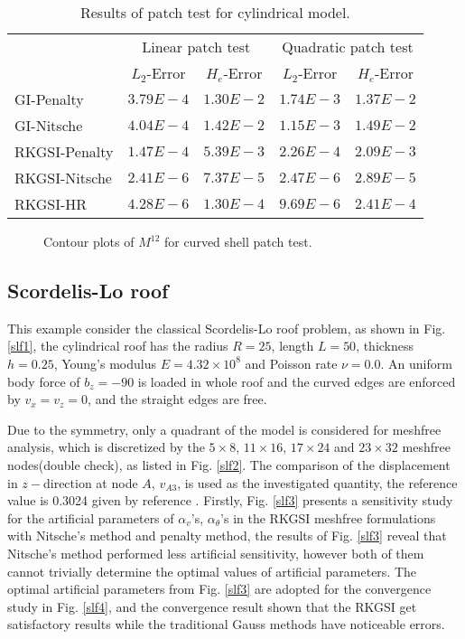 \begin{table}[!ht]
\centering
\caption{Results of patch test for cylindrical model.}\label{ptt2}
\begin{tabular}{lcccc}
\toprule
 & \multicolumn{2}{c}{Linear patch test} & \multicolumn{2}{c}{Quadratic patch test} \\ \cline{2-5}
 & $L_2$-Error & $H_e$-Error & $L_2$-Error & $H_e$-Error \\
    \midrule
    GI-Penalty & $3.79E-4$ & $1.30E-2$ & $1.74E-3$ & $1.37E-2$ \\
    GI-Nitsche & $4.04E-4$ & $1.42E-2$ & $1.15E-3$ & $1.49E-2$ \\
    RKGSI-Penalty & $1.47E-4$ & $5.39E-3$ & $2.26E-4$ & $2.09E-3$ \\
    RKGSI-Nitsche & $2.41E-6$ & $7.37E-5$ & $2.47E-6$ & $2.89E-5$ \\
    RKGSI-HR & $4.28E-6$ & $1.30E-4$ & $9.69E-6$ & $2.41E-4$ \\
    \bottomrule
\end{tabular}
\end{table}

\begin{figure}[!ht]
\centering
\caption{Contour plots of $M^{12}$ for curved shell patch test.}\label{ptf2}
\end{figure}

\subsection{Scordelis-Lo roof}
This example consider the classical Scordelis-Lo roof problem, as shown in Fig. \ref{slf1}, the cylindrical roof has the radius $R=25$, length $L=50$, thickness $h=0.25$, Young's modulus $E=4.32\times 10^8$ and Poisson rate $\nu=0.0$. An uniform body force of $b_z = -90$ is loaded in whole roof and the curved edges are enforced by $v_x=v_z=0$, and the straight edges are free.

Due to the symmetry, only a quadrant of the model is considered for meshfree analysis, which is discretized by the $5\times 8$, $11\times 16$, $17\times 24$ and $23\times32$ meshfree nodes(double check), as listed in Fig. \ref{slf2}. The comparison of the displacement in $z-$direction at node $A$, $v_{A3}$, is used as the investigated quantity, the reference value is 0.3024 given by reference \cite{macneal1985}. Firstly, Fig. \ref{slf3} presents a sensitivity study for the artificial parameters of $\alpha_v$'s, $\alpha_\theta$'s in the RKGSI meshfree formulations with Nitsche's method and penalty method, the results of Fig. \ref{slf3} reveal that Nitsche's method performed less artificial sensitivity, however both of them cannot trivially determine the optimal values of artificial parameters. The optimal artificial parameters from Fig. \ref{slf3} are adopted for the convergence study in Fig. \ref{slf4}, and the convergence result shown that the RKGSI get satisfactory results while the traditional Gauss methods have noticeable errors.

